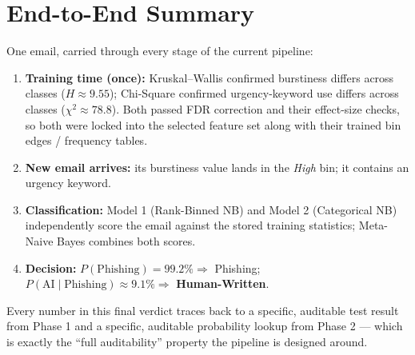 \documentclass[11pt]{article}
\begin{document}
\section{End-to-End Summary}
One email, carried through every stage of the current pipeline:

\begin{enumerate}[leftmargin=1.4cm]
\item \textbf{Training time (once):} Kruskal--Wallis confirmed burstiness differs across classes
($H\approx9.55$); Chi-Square confirmed urgency-keyword use differs across classes ($\chi^2\approx78.8$).
Both passed FDR correction and their effect-size checks, so both were locked into the selected feature
set along with their trained bin edges / frequency tables.
\item \textbf{New email arrives:} its burstiness value lands in the \emph{High} bin; it contains an
urgency keyword.
\item \textbf{Classification:} Model 1 (Rank-Binned NB) and Model 2 (Categorical NB) independently score
the email against the stored training statistics; Meta-Naive Bayes combines both scores.
\item \textbf{Decision:} $P(\text{Phishing})=99.2\%\Rightarrow$ Phishing; $P(\text{AI}\mid\text{Phishing})
\approx9.1\%\Rightarrow$ \textbf{Human-Written}.
\end{enumerate}

Every number in this final verdict traces back to a specific, auditable test result from Phase 1 and a
specific, auditable probability lookup from Phase 2 --- which is exactly the ``full auditability''
property the pipeline is designed around.
\end{document}

